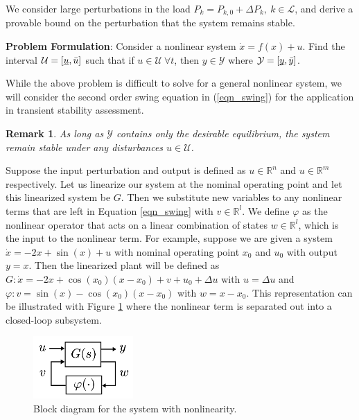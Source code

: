 \documentclass[journal]{IEEEtran}
\newtheorem*{remark}{Remark}
\begin{document}
We consider large perturbations in the load $P_k=P_{k,0}+\Delta P_k, \ k\in\mathcal{L}$, and derive a provable bound on the perturbation that the system remains stable.

\noindent\textbf{Problem Formulation}: Consider a nonlinear system $\dot{x}=f(x)+u$. Find the interval $\mathcal{U}=[\underbar{$u$},\bar{u}]$ such that if $u\in\mathcal{U}\ \forall t$, then $y\in\mathcal{Y}$ where $\mathcal{Y}=[\underbar{$y$},\bar{y}]$.

While the above problem is difficult to solve for a general nonlinear system, we will consider the second order swing equation in (\ref{eqn_swing}) for the application in transient stability assessment.

\begin{remark}
As long as $\mathcal{Y}$ contains only the desirable equilibrium, the system remain stable under any disturbances $u\in\mathcal{U}$.
\end{remark}

Suppose the input perturbation and output is defined as $u\in\mathbb{R}^{n}$ and $u\in\mathbb{R}^{m}$ respectively. Let us linearize our system at the nominal operating point and let this linearized system be $G$. Then we substitute new variables to any nonlinear terms that are left in Equation \ref{eqn_swing} with $v\in\mathbb{R}^{l}$. We define $\varphi$ as the nonlinear operator that acts on a linear combination of states $w\in\mathbb{R}^{l}$, which is the input to the nonlinear term. For example, suppose we are given a system $\dot{x}=-2x+\sin(x)+u$ with nominal operating point $x_0$ and $u_0$ with output $y=x$. Then the linearized plant will be defined as $G: \dot{x}=-2x+\cos(x_0)(x-x_0)+v+u_0+\Delta u$ with $u=\Delta u$ and $\varphi: v=\sin(x)-\cos(x_0)(x-x_0)$ with $w=x-x_0$. This representation can be illustrated with Figure \ref{fig_system_w_uncertainty} where the nonlinear term is separated out into a closed-loop subsystem.

\begin{figure}[!htbp]
	\centering
	\includegraphics[width=1.5in]{picture/system_w_uncertainty.png}
	\caption{Block diagram for the system with nonlinearity.}
	\label{fig_system_w_uncertainty}
\end{figure}
\end{document}
